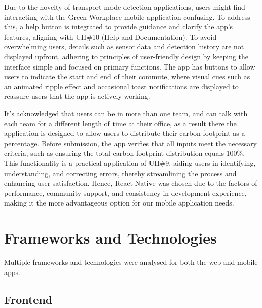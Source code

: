 \documentclass{l4proj}
\begin{document}
Due to the novelty of transport mode detection applications, users might find interacting with the Green-Workplace mobile application confusing. To address this, a help button is integrated to provide guidance and clarify the app's features, aligning with UH\#10 (Help and Documentation). To avoid overwhelming users, details such as sensor data and detection history are not displayed upfront, adhering to principles of user-friendly design by keeping the interface simple and focused on primary functions. The app has buttons to allow users to indicate the start and end of their commute, where visual cues such as an animated ripple effect and occasional toast notifications are displayed to reassure users that the app is actively working.

It's acknowledged that users can be in more than one team, and can talk with each team for a different length of time at their office, as a result there the application is designed to allow users to distribute their carbon footprint as a percentage. Before submission, the app verifies that all inputs meet the necessary criteria, such as ensuring the total carbon footprint distribution equals 100\%. This functionality is a practical application of UH\#9, aiding users in identifying, understanding, and correcting errors, thereby streamlining the process and enhancing user satisfaction. Hence, React Native was chosen due to the factors of performance, community support, and consistency in development experience, making it the more advantageous option for our mobile application needs.

\section{Frameworks and Technologies}
Multiple frameworks and technologies were analysed for both the web and mobile apps.

\subsection{Frontend}
\end{document}
